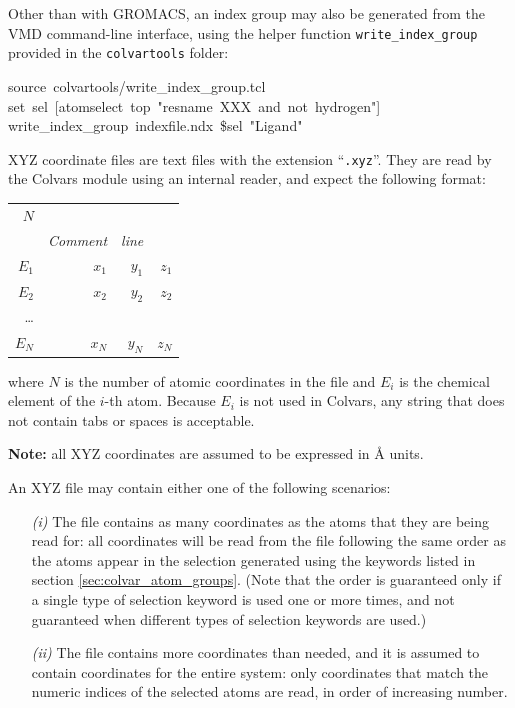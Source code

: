 Other than with GROMACS, an index group may also be generated from the VMD command-line interface, using the helper function \texttt{write\_index\_group} provided in the \texttt{colvartools} folder:
\begin{mdexampleinput}
\-source~colvartools/write\_index\_group.tcl\\
\-set~sel~[atomselect~top~"resname~XXX~and~not~hydrogen"]\\
\-write\_index\_group~indexfile.ndx~\${sel}~"Ligand"
\end{mdexampleinput}


XYZ coordinate files are text files with the extension ``\texttt{.xyz}''. They are read by the Colvars module using an internal reader, and expect the following format:

\noindent\begin{tabular}{r r r r}
$N$\\
& \emph{Comment} & \emph{line} & \\
$E_{1}$ & $x_{1}$ & $y_{1}$ & $z_{1}$\\
$E_{2} $ & $x_{2}$ & $y_{2}$ & $z_{2}$\\
\ldots\\
$E_{N}$ & $x_{N}$ & $y_{N}$ & $z_{N}$ \\
\end{tabular}

\noindent{}where $N$ is the number of atomic coordinates in the file and $E_i$ is the chemical element of the $i$-th atom.
Because $E_i$ is not used in Colvars, any string that does not contain tabs or spaces is acceptable.

\textbf{Note:} all XYZ coordinates are assumed to be expressed in \AA{} units.

An XYZ file may contain either one of the following scenarios:
\begin{enumerate}
\item[\emph{(i)}] The file contains as many coordinates as the atoms that they are being read for: all coordinates will be read from the file following the same order as the atoms appear in the selection generated using the keywords listed in section \ref{sec:colvar_atom_groups}.
  (Note that the order is guaranteed only if a single type of selection keyword is used one or more times, and not guaranteed when different types of selection keywords are used.)
\item[\emph{(ii)}] The file contains more coordinates than needed, and it is assumed to contain coordinates for the entire system: only coordinates that match the numeric indices of the selected atoms are read, in order of increasing number.
\end{enumerate}

